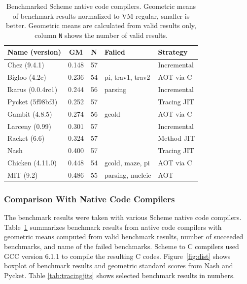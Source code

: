 \documentclass[preprint, 10pt]{sigplanconf}
\begin{document}
\begin{table}
  \centering
  \begin{tabular}{lccp{11mm}l}
    Name (version) & GM & N & Failed & Strategy \\
    \toprule
    Chez (9.4.1) &  0.148 & 57 & & Incremental \\
    \midrule
    Bigloo (4.2c) & 0.236 & 54 & pi, trav1, trav2 & AOT via C \\
    \midrule
    Ikarus (0.0.4rc1) & 0.244 & 56 & parsing & Incremental \\
    \midrule
    Pycket (5f98bf3) & 0.252 & 57 & & Tracing JIT \\
    \midrule
    Gambit (4.8.5) & 0.274 & 56 & gcold & AOT via C \\
    \midrule
    Larceny (0.99) &  0.301 & 57 & & Incremental \\
    \midrule
    Racket  (6.6) &  0.324 & 57 & & Method JIT \\
    \midrule
    Nash & 0.400 & 57 & & Tracing JIT \\
    \midrule
    Chicken (4.11.0) & 0.448 & 54 & gcold, maze, pi & AOT via C \\
    \midrule
    MIT (9.2) &  0.486 & 55 & parsing, nucleic & AOT \\
  \end{tabular}
  \caption{Benchmarked Scheme native code compilers. Geometric
    means of benchmark results normalized to VM-regular, smaller is
    better. Geometric means are calculated from valid results only, column
    \texttt{N} shows the number of valid results.}
\label{tab:nativecomp}
\end{table}

\subsubsection{Comparison With Native Code Compilers}

The benchmark results were taken with various Scheme native code compilers.
Table~\hyperref[tab:impls]{\ref{tab:nativecomp}} summarizes benchmark results
from native code compilers with geometric means computed from valid benchmark
results, number of succeeded benchmarks, and name of the failed
benchmarks. Scheme to C compilers used GCC version 6.1.1 to compile the
resulting C codes. Figure~\hyperref[fig:dist]{\ref{fig:dist}} shows boxplot of
benchmark results and geometric standard scores from Nash and Pycket. Table
\hyperref[tab:tracingjits]{\ref{tab:tracingjits}} shows selected benchmark
results in numbers.
\end{document}
